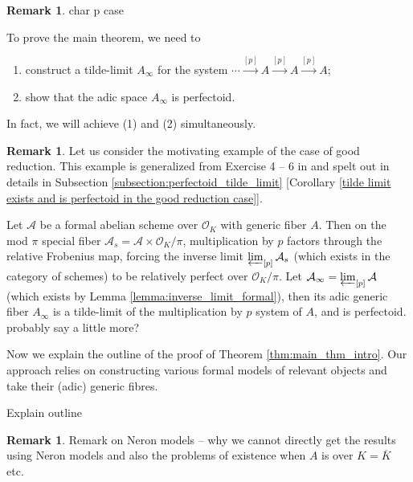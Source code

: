 \documentclass[10pt,oneside]{amsart}
\theoremstyle{definition}
\newtheorem{remark*}[mainthm]{Remark}
\begin{document}
\begin{remark*}	 
{\color{red}  char p case }
\end{remark*}

 To prove the main theorem,  we need to 
\begin{enumerate}
\item construct a tilde-limit $A_\infty$ for the system $ \cdots \xrightarrow{[p]} A \xrightarrow{[p]} A \xrightarrow{[p]} A $;
\item show that the adic space $A_\infty$ is perfectoid. 
\end{enumerate}
In fact, we will achieve (1) and (2) simultaneously. 

\begin{remark*}	\label{remark:good_reduction}
Let us consider the motivating example of the case of good reduction. This example is generalized from Exercise 4 -- 6 in \cite{Bhatt} and spelt out in details in Subsection \ref{subsection:perfectoid_tilde_limit} [Corollary \ref{tilde limit exists and is perfectoid in the good reduction case}]. 

Let $\mathcal A$ be a formal abelian scheme over $\mathcal O_K$ with generic fiber $A$. Then on the mod $\pi$ special fiber $\mathcal A_s = \mathcal A \times \mathcal O_K/\pi$,  multiplication by $p$ factors through the relative Frobenius map, forcing the inverse limit $ \varprojlim_{[p]} \mathcal A_s $ (which exists in the category of schemes) to be relatively perfect over $\mathcal O_K/\pi$. Let $\mathcal A_{\infty} = \varprojlim_{[p]} \mathcal A$ (which exists by Lemma \ref{lemma:inverse_limit_formal}), then its adic generic fiber $A_\infty$ is a tilde-limit of the multiplication by $p$ system of $A$, and is perfectoid.  {\color{red} probably say a little more?}
\end{remark*}

Now we explain the outline of the proof of Theorem \ref{thm:main_thm_intro}. Our approach relies on constructing various formal models of relevant objects and take their (adic) generic fibres. 

{\color{red} Explain outline}

\begin{remark*}	
{\color{red} Remark on Neron models -- why we cannot directly get the results using Neron models and also the problems of existence when $A$ is over $K = \overline K$ etc. }
\end{remark*}

\vspace*{0.2cm}
\end{document}
